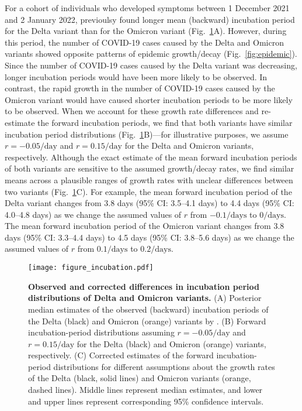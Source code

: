 \documentclass[12pt]{article}
\newcommand{\fref}[1]{Fig.~\ref{fig:#1}}
\begin{document}
For a cohort of individuals who developed symptoms between 1 December 2021 and 2 January 2022, \citep{backer2021omicron} previoulsy found longer mean (backward) incubation period for the Delta variant than for the Omicron variant (\fref{incubation}A).
However, during this period, the number of COVID-19 cases caused by the Delta and Omicron variants showed opposite patterns of epidemic growth/decay (\fref{epidemic}).
Since the number of COVID-19 cases caused by the Delta variant was decreasing, longer incubation periods would have been more likely to be observed.
In contrast, the rapid growth in the number of COVID-19 cases caused by the Omicron variant would have caused shorter incubation periods to be more likely to be observed.
When we account for these growth rate differences and re-estimate the forward incubation periods, we find that both variants have similar incubation period distributions (\fref{incubation}B)---for illustrative purposes, we assume $r=-0.05/\mathrm{day}$ and $r=0.15/\mathrm{day}$ for the Delta and Omicron variants, respectively.
Although the exact estimate of the mean forward incubation periods of both variants are sensitive to the assumed growth/decay rates, we find similar means across a plausible ranges of growth rates with unclear differences between two variants (\fref{incubation}C).
For example, the mean forward incubation period of the Delta variant changes from 3.8 days (95\% CI: 3.5--4.1 days) to 4.4 days (95\% CI: 4.0--4.8 days) as we change the assumed values of $r$ from $-0.1/\mathrm{days}$ to $0/\mathrm{days}$.
The mean forward incubation period of the Omicron variant changes from 3.8 days (95\% CI: 3.3--4.4 days) to 4.5 days (95\% CI: 3.8--5.6 days) as we change the assumed values of $r$ from $0.1/\mathrm{days}$ to $0.2/\mathrm{days}$.

\begin{figure}[!th]
\texttt{[image: figure\_incubation.pdf]}
\caption{
\textbf{Observed and corrected differences in incubation period distributions of Delta and Omicron variants.}
(A) Posterior median estimates of the observed (backward) incubation periods of the Delta (black) and Omicron (orange) variants by \cite{backer2021omicron}.
(B) Forward incubation-period distributions assuming $r=-0.05/\mathrm{day}$ and $r=0.15/\mathrm{day}$ for the Delta (black) and Omicron (orange) variants, respectively.
(C) Corrected estimates of the forward incubation-period distributions for different assumptions about the growth rates of the Delta (black, solid lines) and Omicron variants (orange, dashed lines).
Middle lines represent median estimates, and lower and upper lines represent corresponding 95\% confidence intervals.
\label{fig:incubation}
}
\end{figure}
\end{document}
